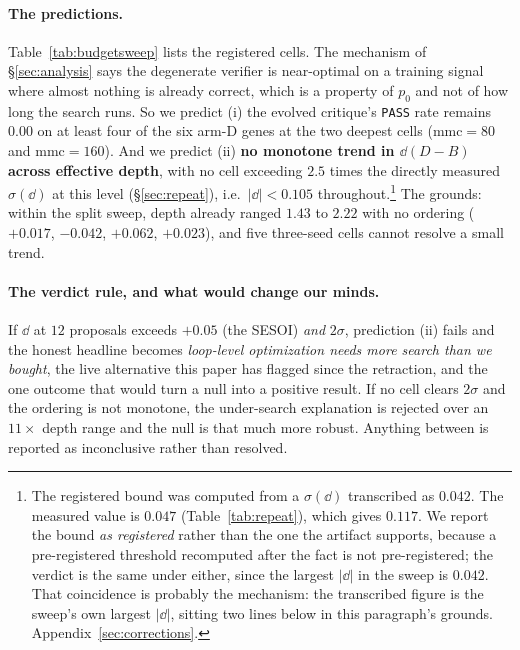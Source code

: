 \documentclass[11pt]{article}
\begin{document}
\paragraph{The predictions.} Table~\ref{tab:budgetsweep} lists the registered cells. The
mechanism of \S\ref{sec:analysis} says the degenerate verifier
is near-optimal on a training signal where almost nothing is already correct, which is a property of
$p_0$ and not of how long the search runs. So we predict (i) the evolved critique's \texttt{PASS}
rate remains $0.00$ on at least four of the six arm-D genes at the two deepest cells
($\mathrm{mmc}{=}80$ and $\mathrm{mmc}{=}160$). And we predict (ii) \textbf{no monotone trend in
$\dd(D-B)$ across effective depth}, with no cell exceeding $2.5$ times the directly measured
$\sigma(\dd)$ at this level (\S\ref{sec:repeat}), i.e.\ $|\dd| < 0.105$ throughout.\footnote{The
registered bound was computed from a $\sigma(\dd)$ transcribed as $0.042$. The measured value is
$0.047$ (Table~\ref{tab:repeat}), which gives $0.117$. We report the bound \emph{as registered}
rather than the one the artifact supports, because a pre-registered threshold recomputed after the
fact is not pre-registered; the verdict is the same under either, since the largest $|\dd|$ in the
sweep is $0.042$. That coincidence is probably the mechanism: the transcribed figure is the sweep's
own largest $|\dd|$, sitting two lines below in this paragraph's grounds.
Appendix~\ref{sec:corrections}.} The
grounds: within the split sweep, depth already ranged $1.43$ to $2.22$ with no ordering
($+0.017$, $-0.042$, $+0.062$, $+0.023$), and five three-seed cells cannot resolve a small trend.

\paragraph{The verdict rule, and what would change our minds.} If $\dd$ at $12$ proposals exceeds
$+0.05$ (the SESOI) \emph{and} $2\sigma$, prediction (ii) fails and the honest headline becomes
\emph{loop-level optimization needs more search than we bought}, the live alternative this
paper has flagged since the retraction, and the one outcome that would turn a null into a
positive result. If no cell clears $2\sigma$ and the ordering is not monotone, the under-search
explanation is rejected over an $11\times$ depth range and the null is that much more robust.
Anything between is reported as inconclusive rather than resolved.
\end{document}
